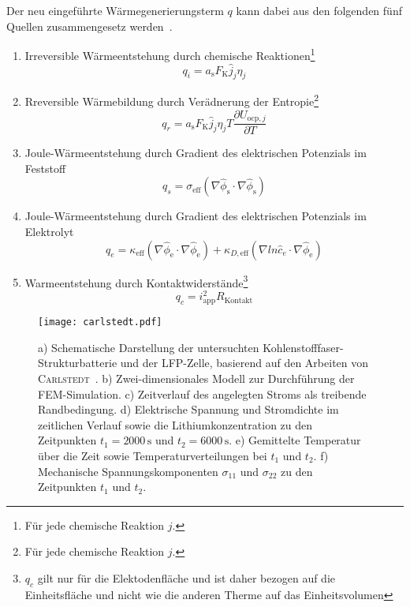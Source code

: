 Der neu eingeführte Wärmegenerierungsterm $q$ kann dabei aus den folgenden fünf Quellen zusammengesetz werden~\cite{Plett2015}.
\begin{enumerate}
    \item Irreversible Wärmeentstehung durch chemische Reaktionen\footnote{Für jede chemische Reaktion $j$.}
    \begin{equation}
        q_i = a_{\text{s}} F_{\text{K}} \hat{j}_j \eta_{j}
    \end{equation}
    \item Rreversible Wärmebildung durch Verädnerung der Entropie\footnote{Für jede chemische Reaktion $j$.}
    \begin{equation}
    q_{r} = a_{\text{s}} F_{\text{K}} \hat{j}_j \eta_{j} T \frac{\partial U_{\text{ocp},j}}{\partial T}
    \end{equation}
    \item Joule-Wärmeentstehung durch Gradient des elektrischen Potenzials im Feststoff
    \begin{equation}
    q_{s} = \sigma_{\text{eff}}(\nabla\hat{\phi}_{\text{s}} \cdot \nabla\hat{\phi}_{\text{s}})
    \end{equation}
    \item Joule-Wärmeentstehung durch Gradient des elektrischen Potenzials im Elektrolyt
    \begin{equation}
        q_{e} = \kappa_{\text{eff}}(\nabla\hat{\phi}_{\text{e}} \cdot \nabla\hat{\phi}_{\text{e}}) + \kappa_{D,\text{eff}} (\nabla ln \hat{c}_e \cdot \nabla \hat{\phi}_{\text{e}})
    \end{equation}
    \item Warmeentstehung durch Kontaktwiderstände\footnote{$q_c$ gilt nur für die Elektodenfläche und ist daher bezogen auf die Einheitsfläche und nicht wie die anderen Therme auf das Einheitsvolumen}
    \begin{equation}
        q_{c} = i_{\text{app}}^2 R_{\text{Kontakt}}
    \end{equation}
\end{enumerate}

\begin{figure}[!h]
        \center
		\texttt{[image: carlstedt.pdf]}
		\caption{\label{fig:carlstedt}a) Schematische Darstellung der untersuchten Kohlenstofffaser-Strukturbatterie und der LFP-Zelle, basierend auf den Arbeiten von \textsc{Carlstedt}~\cite{Carlstedt2022b}. b) Zwei-dimensionales Modell zur Durchführung der FEM-Simulation. c) Zeitverlauf des angelegten Stroms als treibende Randbedingung. d) Elektrische Spannung und Stromdichte im zeitlichen Verlauf sowie die Lithiumkonzentration zu den Zeitpunkten $t_1 = 2000\,\text{s}$ und $t_2 = 6000\,\text{s}$. e) Gemittelte Temperatur über die Zeit sowie Temperaturverteilungen bei $t_1$ und $t_2$. f) Mechanische Spannungskomponenten $\sigma_{11}$ und $\sigma_{22}$ zu den Zeitpunkten $t_1$ und $t_2$.
        }
\end{figure}

